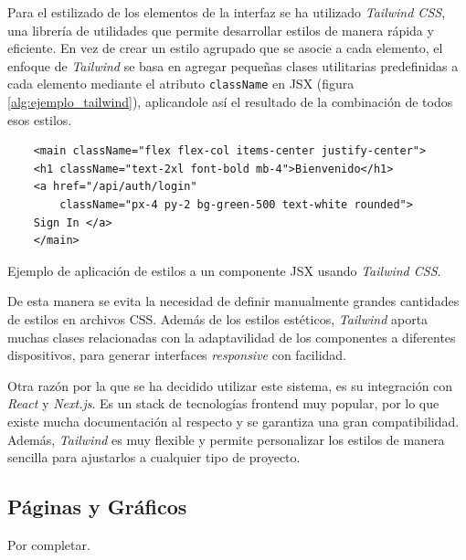 Para el estilizado de los elementos de la interfaz se ha utilizado \textit{Tailwind CSS}, una librería de utilidades que permite desarrollar estilos de manera rápida y eficiente. En vez de crear un estilo agrupado que se asocie a cada elemento, el enfoque de \textit{Tailwind} se basa en agregar pequeñas clases utilitarias predefinidas a cada elemento mediante el atributo \texttt{className} en JSX (figura \ref{alg:ejemplo_tailwind}), aplicandole así el resultado de la combinación de todos esos estilos.

\setlength{\intextsep}{15pt} %
\setlength{\abovecaptionskip}{0pt} %
\setlength{\belowcaptionskip}{0pt} %

\begin{ifalgorithm}[H]
    \begin{lstlisting}
    <main className="flex flex-col items-center justify-center">
    <h1 className="text-2xl font-bold mb-4">Bienvenido</h1>
    <a href="/api/auth/login"
        className="px-4 py-2 bg-green-500 text-white rounded">
    Sign In </a>
    </main>
    \end{lstlisting}
    \caption{Ejemplo de aplicación de estilos a un componente JSX usando \textit{Tailwind CSS}.}
    \label{alg:ejemplo_tailwind}
\end{ifalgorithm}

De esta manera se evita la necesidad de definir manualmente grandes cantidades de estilos en archivos CSS. Además de los estilos estéticos, \textit{Tailwind} aporta muchas clases relacionadas con la adaptavilidad de los componentes a diferentes dispositivos, para generar interfaces \textit{responsive} con facilidad.

Otra razón por la que se ha decidido utilizar este sistema, es su integración con \textit{React} y \textit{Next.js}. Es un stack de tecnologías frontend muy popular, por lo que existe mucha documentación al respecto y se garantiza una gran compatibilidad. Además, \textit{Tailwind} es muy flexible y permite personalizar los estilos de manera sencilla para ajustarlos a cualquier tipo de proyecto.

\subsection{Páginas y Gráficos}

Por completar.

